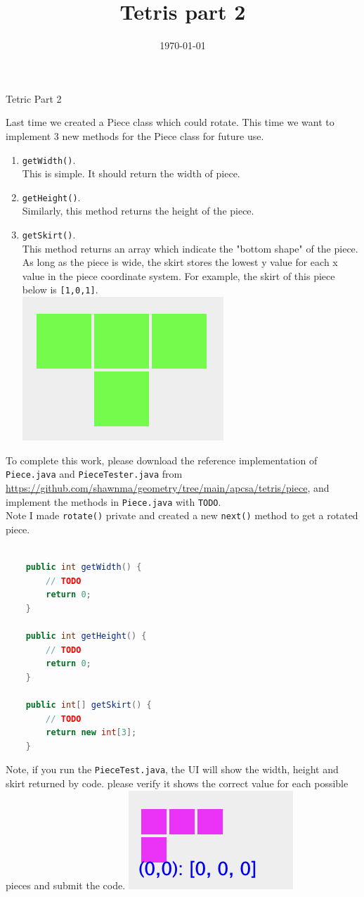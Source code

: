\documentclass[letterpaper,12pt]{article}
\date{\today}
\title{Tetris part 2}
\begin{document}
\begin{center}
    \Large{Tetric Part 2}
\end{center}
Last time we created a Piece class which could rotate. This time we want to implement 3 new methods for the Piece class for future use.

\begin{enumerate}
    \item \verb|getWidth()|.\\ This is simple. It should return the width of piece.
    \item \verb|getHeight()|.\\ Similarly, this method returns the height of the piece.
    \item \verb|getSkirt()|.\\This method returns an array which indicate the "bottom shape" of the piece. As long as the piece is wide, the skirt stores the lowest
    y value for each x value in the piece coordinate system. For example, the skirt of this piece below is \verb|[1,0,1]|.
    \\\includegraphics[scale=0.5]{skrt.png}
\end{enumerate}
 To complete this work, please download the reference implementation of
 \verb|Piece.java| and \verb|PieceTester.java| from
 \href{https://github.com/shawnma/geometry/tree/main/apcsa/tetris/piece}{https://github.com/shawnma/geometry/tree/main/apcsa/tetris/piece}, and implement the methods in \verb|Piece.java| with \verb|TODO|.
 \\ Note I made \verb|rotate()| private and created a new \verb|next()| method to get a rotated piece.
 \begin{lstlisting}[language=java]
 
    public int getWidth() {
        // TODO
        return 0;
    }

    public int getHeight() {
        // TODO
        return 0;
    }

    public int[] getSkirt() {
        // TODO
        return new int[3];
    }
 \end{lstlisting}
 Note, if you run the \verb|PieceTest.java|, the UI will show the width, height and skirt returned by code. please verify it shows the correct
 value for each possible pieces and submit the code.
 \includegraphics{size.png}
\end{document}
